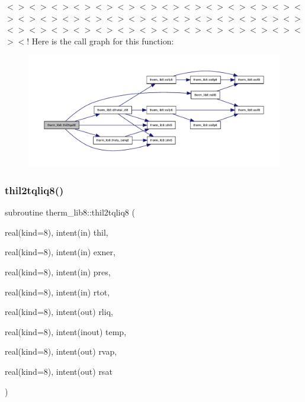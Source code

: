 $<$$>$$<$$>$$<$$>$$<$$>$$<$$>$$<$$>$$<$$>$$<$$>$$<$$>$$<$$>$$<$$>$$<$$>$$<$$>$$<$$>$$<$$>$$<$$>$$<$$>$$<$$>$$<$$>$$<$$>$$<$$>$$<$$>$$<$$>$$<$$>$$<$$>$$<$$>$$<$$>$$<$$>$$<$$>$$<$$>$$<$$>$$<$$>$$<$$>$$<$$>$$<$$>$$<$$>$$<$$>$$<$$>$$<$$>$$<$$>$$<$$>$$<$! Here is the call graph for this function\+:
\nopagebreak
\begin{figure}[H]
\begin{center}
\leavevmode
\includegraphics[width=350pt]{namespacetherm__lib8_ac25af6f3203cd6cbf1e3933ae25eaeca_cgraph}
\end{center}
\end{figure}
\mbox{\label{namespacetherm__lib8_aec7ba278ae89d43e89ab00a29a825416}} 
\subsubsection{\texorpdfstring{thil2tqliq8()}{thil2tqliq8()}}
{\footnotesize\ttfamily subroutine therm\+\_\+lib8\+::thil2tqliq8 (\begin{DoxyParamCaption}\item[{real(kind=8), intent(in)}]{thil,  }\item[{real(kind=8), intent(in)}]{exner,  }\item[{real(kind=8), intent(in)}]{pres,  }\item[{real(kind=8), intent(in)}]{rtot,  }\item[{real(kind=8), intent(out)}]{rliq,  }\item[{real(kind=8), intent(inout)}]{temp,  }\item[{real(kind=8), intent(out)}]{rvap,  }\item[{real(kind=8), intent(out)}]{rsat }\end{DoxyParamCaption})}

